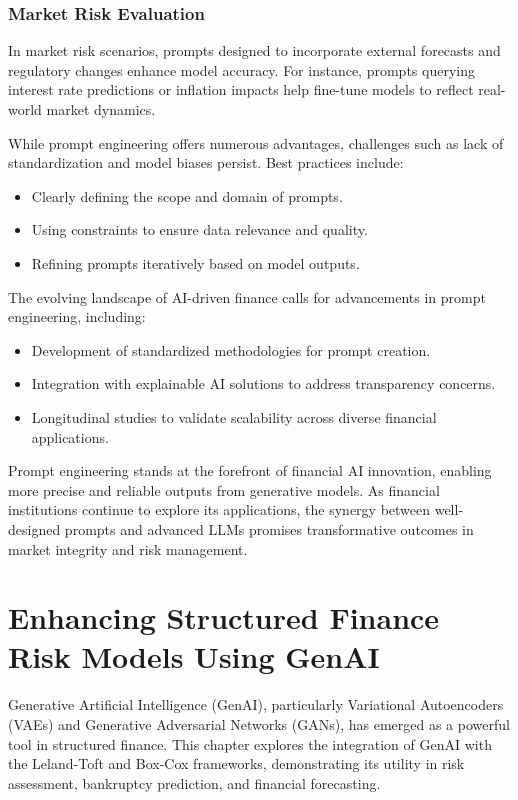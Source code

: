\documentclass[a4paper,headinclude=on,footinclude=on,12pt,oneside]{scrbook}
\begin{document}
	\subsection{Market Risk Evaluation}
	In market risk scenarios, prompts designed to incorporate external forecasts and regulatory changes enhance model accuracy. For instance, prompts querying interest rate predictions or inflation impacts help fine-tune models to reflect real-world market dynamics.
	
	While prompt engineering offers numerous advantages, challenges such as lack of standardization and model biases persist. Best practices include:
	\begin{itemize}
		\item Clearly defining the scope and domain of prompts.
		\item Using constraints to ensure data relevance and quality.
		\item Refining prompts iteratively based on model outputs.
	\end{itemize}
	
	The evolving landscape of AI-driven finance calls for advancements in prompt engineering, including:
	\begin{itemize}
		\item Development of standardized methodologies for prompt creation.
		\item Integration with explainable AI solutions to address transparency concerns.
		\item Longitudinal studies to validate scalability across diverse financial applications.
	\end{itemize}
	
	Prompt engineering stands at the forefront of financial AI innovation, enabling more precise and reliable outputs from generative models. As financial institutions continue to explore its applications, the synergy between well-designed prompts and advanced LLMs promises transformative outcomes in market integrity and risk management.
	
	
	
	\chapter{Enhancing Structured Finance Risk Models Using GenAI}
	
	Generative Artificial Intelligence (GenAI), particularly Variational Autoencoders (VAEs) and Generative Adversarial Networks (GANs), has emerged as a powerful tool in structured finance. This chapter explores the integration of GenAI with the Leland-Toft and Box-Cox frameworks, demonstrating its utility in risk assessment, bankruptcy prediction, and financial forecasting.
	
\end{document}
